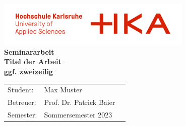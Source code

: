 \documentclass[12pt,digital]{hska}
\begin{document}

% 

\thispagestyle{plain}
\begin{titlepage}
\begin{center}
\includegraphics[width=0.7\textwidth]{images/hka_logo.png}\\[12ex]

\LARGE{\textbf{Seminararbeit}}\\[8ex]

\textbf{Titel der Arbeit\\
ggf. zweizeilig}\\[12ex]

\normalsize{}
\begin{tabular}{lll}
Student:  & \quad Max Muster\\[3ex]
Betreuer:  & \quad Prof. Dr. Patrick Baier &\\[3ex]
Semester: & \quad Sommersemester 2023\\[3ex]
\end{tabular}

\end{center}
\end{titlepage}

\tableofcontents
\end{document}

